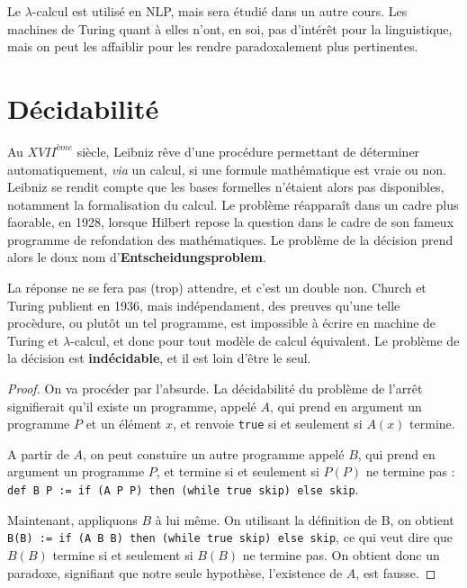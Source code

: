Le $\lambda$-calcul est utilisé en NLP, mais sera étudié dans un autre cours. Les machines de Turing quant à elles n'ont, en soi, pas d'intérêt pour la linguistique, mais on peut les affaiblir pour les rendre paradoxalement plus pertinentes.

\section{Décidabilité}

Au $XVII^{ème}$ siècle, Leibniz rêve d'une procédure permettant de déterminer automatiquement, \textit{via} un calcul, si une formule mathématique est vraie ou non. Leibniz se rendit compte que les bases formelles n'étaient alors pas disponibles, notamment la formalisation du calcul. Le problème réapparaît dans un cadre plus faorable, en 1928, lorsque Hilbert repose la question dans le cadre de son fameux programme de refondation des mathématiques. Le problème de la décision prend alors le doux nom d'\textbf{Entscheidungsproblem}. 

La réponse ne se fera pas (trop) attendre, et c'est un double non. Church et Turing publient en 1936, mais indépendament, des preuves qu'une telle procèdure, ou plutôt un tel programme, est impossible à écrire en machine de Turing et $\lambda$-calcul, et donc pour tout modèle de calcul équivalent. Le problème de la décision est \textbf{indécidable}, et il est loin d'être le seul.

\begin{theorem}{\textbf(Indécidabilité du problème de l'arrêt)}} Savoir si un programme termine est un problème indécidable.
\end{theorem}

\begin{proof}
On va procéder par l'absurde. La décidabilité du problème de l'arrêt signifierait qu'il existe un programme, appelé $A$, qui prend en argument un programme $P$ et un élément $x$, et renvoie \verb!true! si et seulement si $A(x)$ termine.

A partir de $A$, on peut constuire un autre programme appelé $B$, qui prend en argument un programme $P$, et termine si et seulement si $P(P)$ ne termine pas :\\
\verb!def B P := if (A P P) then (while true skip) else skip!.

Maintenant, appliquons $B$ à lui même. On utilisant la définition de B, on obtient\\ \verb!B(B) := if (A B B) then (while true skip) else skip!, ce qui veut dire que $B(B)$ termine si et seulement si $B(B)$ ne termine pas. On obtient donc un paradoxe, signifiant que notre seule hypothèse, l'existence de $A$, est fausse.
\end{proof}

